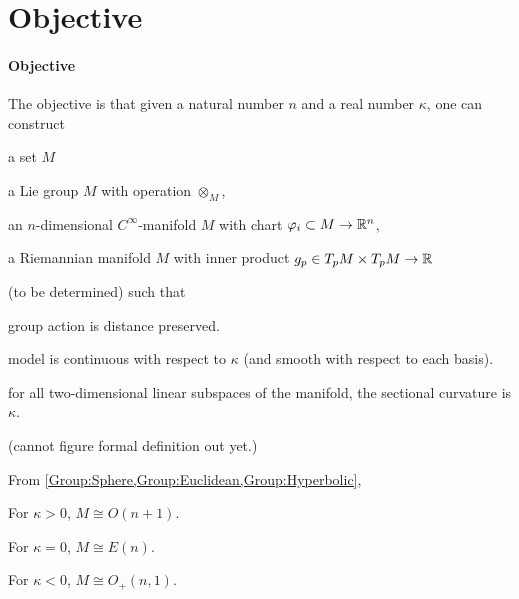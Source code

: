 \documentclass[../main.tex]{subfiles}
\begin{document}
\section{Objective}
\paragraph{Objective}\label{Objective}
The objective is that
given a natural number \(n\) and a real number \(\kappa\),
one can construct
\begin{APAenumerate}
    \item a set \(M\)
    \item a Lie group \(M\) with operation \(\otimes_M\),
    \item an \(n\)-dimensional \(C^\infty\)-manifold \(M\) with chart \(\varphi_i \subset M\to\mathbb{R}^n\),
    \item a Riemannian manifold \(M\) with inner product \(g_p\in T_pM\times T_pM\to\mathbb{R}\)
\end{APAenumerate}
(to be determined)
such that
\begin{APAitemize}
    \item group action is distance preserved.
    \item model is continuous with respect to \(\kappa\) (and smooth with respect to each basis).
    \item for all two-dimensional linear subspaces of the manifold, the sectional curvature is \(\kappa\).
\end{APAitemize}
(cannot figure formal definition out yet.)

\begin{conjecture}\label{GeometricGroupStructure}
    From \cref{Group:Sphere,Group:Euclidean,Group:Hyperbolic},
    \begin{APAitemize}
        \item For \(\kappa>0\), \(M\cong O\left(n+1\right)\).
        \item For \(\kappa=0\), \(M\cong E\left(n\right)\).
        \item For \(\kappa<0\), \(M\cong O_{+}\left(n,1\right)\).
    \end{APAitemize}
\end{conjecture}
\end{document}
